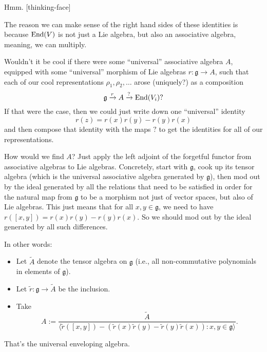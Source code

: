 \documentclass[reqno]{amsart} 
\begin{document}
Hmm.  [thinking-face]



The reason we can make sense of the right hand sides of these identities is because $\operatorname{End}(V)$ is not just a Lie algebra, but also an associative algebra, meaning, we can multiply.

Wouldn't it be cool if there were some ``universal'' associative algebra $A$, equipped with some ``universal'' morphism of Lie algebras $r : \mathfrak{g} \rightarrow A$, such that each of our cool representations $\rho_1, \rho_2, \dotsc$ arose (uniquely?) as a composition
\begin{equation*}
  \mathfrak{g} \xrightarrow{r} A \xrightarrow{?} \operatorname{End}(V_i)?
\end{equation*}
If that were the case, then we could just write down one ``universal'' identity
\begin{equation*}
  r(z) = r(x) r(y) - r(y) r(x)
\end{equation*}
and then compose that identity with the maps $?$ to get the identities for all of our representations.

How would we find $A$?  Just apply the left adjoint of the forgetful functor from associative algebras to Lie algebras.  Concretely, start with $\mathfrak{g}$, cook up its tensor algebra (which is the universal associative algebra generated by $\mathfrak{g}$), then mod out by the ideal generated by all the relations that need to be satisfied in order for the natural map from $\mathfrak{g}$ to be a morphism not just of vector spaces, but also of Lie algebras.  This just means that for all $x, y \in \mathfrak{g}$, we need to have $r([x,y]) = r(x) r(y) - r(y) r(x)$.  So we should mod out by the ideal generated by all such differences.

In other words:
\begin{itemize}
\item Let $\tilde{A}$ denote the tensor algebra on $\mathfrak{g}$ (i.e., all non-commutative polynomials in elements of $\mathfrak{g}$).
\item Let $\tilde{r} : \mathfrak{g} \rightarrow \tilde{A}$ be the inclusion.
\item Take
  \begin{equation*}
    A := \frac{\tilde{A}}{\langle \tilde{r}([x,y]) - (\tilde{r}(x)\tilde{r}(y) - \tilde{r}(y)\tilde{r}(x)) : x, y \in \mathfrak{g} \rangle}.
  \end{equation*}
\end{itemize}
That's the universal enveloping algebra.
\end{document}
